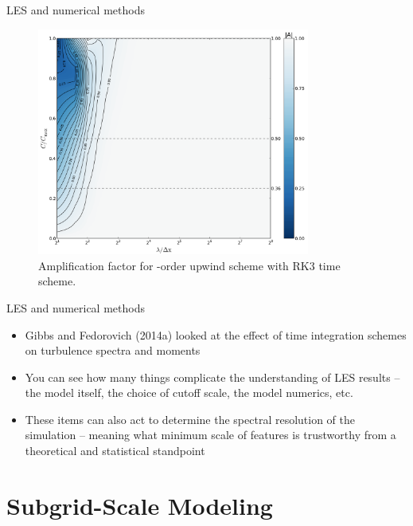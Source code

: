 
\begin{frame}{LES and numerical methods}

\begin{figure}
	\includegraphics[width=0.8\textwidth]{gibbs8}
	\caption{\scriptsize Amplification factor for -order upwind scheme with RK3 time scheme.}
\end{figure}

\end{frame}


\begin{frame}{LES and numerical methods}

\begin{itemize}
\item Gibbs and Fedorovich (2014a) looked at the effect of time integration schemes on turbulence spectra and moments
\item You can see how many things complicate the understanding of LES results -- the model itself, the choice of cutoff scale, the model numerics, etc.
\item These items can also act to determine the spectral resolution of the simulation -- meaning what minimum scale of features is trustworthy from a theoretical and statistical standpoint
\end{itemize}
\end{frame}


\section{Subgrid-Scale Modeling} %

